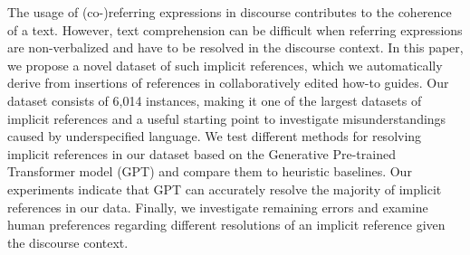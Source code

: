 The usage of (co-)referring expressions in discourse contributes to the coherence of a text. However, text comprehension can be difficult when referring expressions are non-verbalized and have to be resolved in the discourse context. In this paper, we propose a novel dataset of such implicit references, which we automatically derive from insertions of references in collaboratively edited how-to guides. Our dataset consists of 6,014 instances, making it one of the largest datasets of implicit references and a useful starting point to investigate misunderstandings caused by underspecified language. We test different methods for resolving implicit references in our dataset based on the Generative Pre-trained Transformer model (GPT) and compare them to heuristic baselines. Our experiments indicate that GPT can accurately resolve the majority of implicit references in our data. Finally, we investigate remaining errors and examine human preferences regarding different resolutions of an implicit reference given the discourse context.
